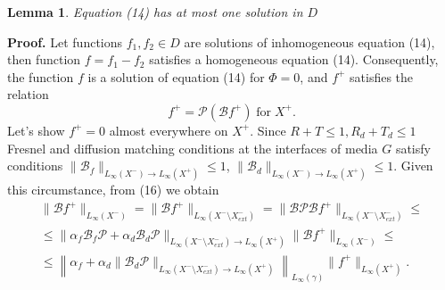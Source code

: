\documentclass[12pt,reqno]{report}
\newtheorem{lemma}{Lemma}
\begin{document}
\begin{lemma}
Equation (14) has at most one solution in $D$ 
\end{lemma}
{\bf Proof.}
Let functions $f_1,f_2\in D$ are solutions of inhomogeneous equation (14), then function $f=f_1-f_2$ satisfies a homogeneous equation (14). Consequently, the function $f$ is a solution of equation (14) for $\Phi = 0$, and $f^+$ satisfies the relation
\begin{equation}
f^+= \mathcal P (\mathcal B f^+)\; \text{for} \; X^+.
\end{equation}
Let's show $f^+=0$ almost everywhere on $X^+$.
Since $R+T \leq 1, R_d+T_d \leq 1$ Fresnel and diffusion matching conditions at the interfaces of media $G$ satisfy conditions  
$\|\mathcal B_f \|_{L_{\infty}(X^-)\to L_{\infty}(X^+)}\leq 1 $, $\|\mathcal B_d \|_{L_{\infty}(X^-)\to L_{\infty}(X^+)} \leq 1$. 
Given this circumstance, from (16) we obtain
\begin{multline}
\|\mathcal B f^+\|_{L_{\infty}(X^-)} = \|\mathcal B f^+\|_{L_{\infty}(X^-\setminus X^-_{ext})} = \| \mathcal B \mathcal P \mathcal B  f^+\|_{L_{\infty}(X^-\setminus X^-_{ext})} \leq \\ \leq  \| \alpha_f \mathcal B_f \mathcal P   +\alpha_d \mathcal B_d \mathcal P\|_{L_{\infty}(X^-\setminus X^-_{ext})\to L_{\infty}(X^+)} \|  \mathcal B f^+\|_{L_{\infty}(X^-)} \leq \\ \leq \left \| \alpha_f  +\alpha_d \|\mathcal B_d  \mathcal P \|_{L_{\infty}(X^-\setminus X^-_{ext})\to L_{\infty}(X^+)} \right\|_{L_{\infty}(\gamma)} \|   f^+\|_{L_{\infty}(X^+)}.
\end{multline}
\end{document}
